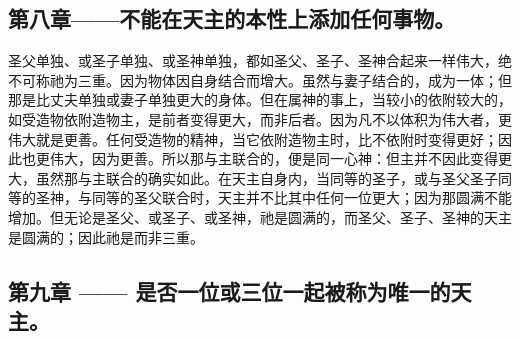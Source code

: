 
\subsection{第八章——不能在天主的本性上添加任何事物。}

圣父单独、或圣子单独、或圣神单独，都如圣父、圣子、圣神合起来一样伟大，绝不可称祂为三重。因为物体因自身结合而增大。虽然与妻子结合的，成为一体；但那是比丈夫单独或妻子单独更大的身体。但在属神的事上，当较小的依附较大的，如受造物依附造物主，是前者变得更大，而非后者。因为凡不以体积为伟大者，更伟大就是更善。任何受造物的精神，当它依附造物主时，比不依附时变得更好；因此也更伟大，因为更善。所以那与主联合的，便是同一心神：但主并不因此变得更大，虽然那与主联合的确实如此。在天主自身内，当同等的圣子，或与圣父圣子同等的圣神，与同等的圣父联合时，天主并不比其中任何一位更大；因为那圆满不能增加。但无论是圣父、或圣子、或圣神，祂是圆满的，而圣父、圣子、圣神的天主是圆满的；因此祂是而非三重。\par


\subsection{第九章 —— 是否一位或三位一起被称为唯一的天主。}

